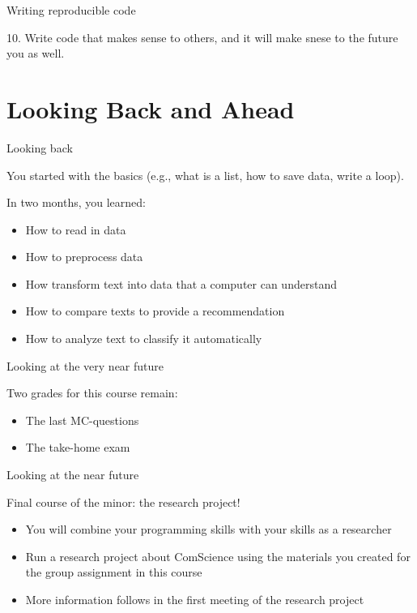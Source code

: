 \documentclass[compress]{beamer}
\begin{document}
\begin{frame}{Writing reproducible code}
	
10. Write code that makes sense to others, and it will make snese to the future you as well.
	
\end{frame}



\section{Looking Back and Ahead}

\begin{frame}{Looking back} 
	
You started with the basics (e.g., what is a list, how to save data, write a loop).\\
\begin{alertblock}{In two months, you learned:}
	\begin{itemize}
		\item How to read in data
		\item How to preprocess data
		\item How transform text into data that a computer can understand
		\item How to compare texts to provide a recommendation
		\item How to analyze text to classify it automatically		
	\end{itemize}
\end{alertblock}	
\end{frame}


\begin{frame}{Looking at the very near future} 
	
\begin{alertblock}{Two grades for this course remain:}
	\begin{itemize}
		\item The last MC-questions 
		\item The take-home exam 
	\end{itemize}
\end{alertblock}	
\end{frame}

\begin{frame}{Looking at the near future} 
\begin{alertblock}{	Final course of the minor: the research project!}
	\begin{itemize}
		\item You will combine your programming skills with your skills as a researcher
		\item Run a research project about ComScience using the materials you created for the group assignment in this course
		\item More information follows in the first meeting of the research project
	\end{itemize}
\end{alertblock}
\end{frame}
\end{document}
